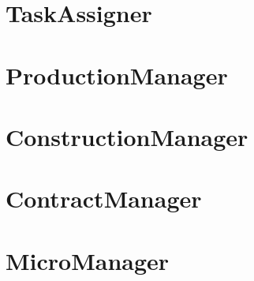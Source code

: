 \section{TaskAssigner}

\section{ProductionManager}

\section{ConstructionManager}

\section{ContractManager}

\section{MicroManager}